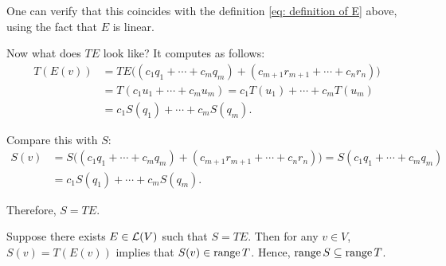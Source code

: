 \begin{xrcs}
\begin{xprf}
    One can verify that this coincides with the definition \eqref{eq: definition of E} above, using the fact that $E$ is linear.

    Now what does $TE$ look like? It computes as follows:
    \begin{equation}
      \begin{aligned}
        T(E(v)) &= TE\Big((c_1 q_1 + \cdots + c_m q_m) + (c_{m+1} r_{m+1} + \cdots + c_n r_n)\Big) \\
        &= T(c_1 u_1 + \cdots + c_m u_m) = c_1 T (u_1) + \cdots + c_m T (u_m) \\
        &= c_1 S (q_1) + \cdots + c_m S (q_m).
      \end{aligned}
    \end{equation}

    Compare this with $S$:
    \begin{equation}
      \begin{aligned}
        S(v) &= S\Big((c_1 q_1 + \cdots + c_m q_m) + (c_{m+1} r_{m+1} + \cdots + c_n r_n)\Big)
        = S(c_1 q_1 + \cdots + c_m q_m) \\
        &= c_1 S (q_1) + \cdots + c_m S (q_m).
      \end{aligned}
    \end{equation}

    Therefore, $S = TE$.

    \Leftarrowdirection Suppose there exists $E \in \mathcal{L} (V)$ such that $S=TE$. Then for any $v \in V$, $S(v) = T(E(v))$ implies that $S(v) \in \operatorname{range} T$. Hence, $\operatorname{range} S \subseteq \operatorname{range} T$.
  \end{xprf}
\end{xrcs}

